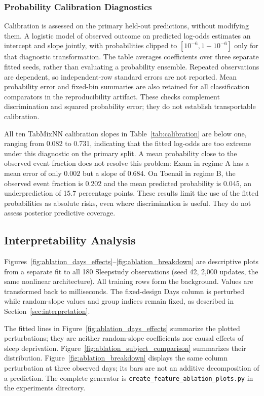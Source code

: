 \subsubsection{Probability Calibration Diagnostics}
Calibration is assessed on the primary held-out predictions, without modifying
them. A logistic model of observed outcome on predicted log-odds estimates an
intercept and slope jointly, with probabilities clipped to $[10^{-6},1-10^{-6}]$
only for that diagnostic transformation. The table averages coefficients over
three separate fitted seeds, rather than evaluating a probability ensemble.
Repeated observations are dependent, so independent-row standard errors are
not reported. Mean probability error and fixed-bin summaries are also retained
for all classification comparators in the reproducibility artifact. These
checks complement discrimination and squared probability error; they do not
establish transportable calibration.


\FloatBarrier

All ten TabMixNN calibration slopes in Table~\ref{tab:calibration} are below
one, ranging from 0.082 to 0.731, indicating that the fitted log-odds are too
extreme under this diagnostic on the primary split. A mean probability close
to the observed event fraction does not resolve this problem: Exam in regime
A has a mean error of only $0.002$ but a slope of 0.684. On Toenail in regime
B, the observed event fraction is 0.202 and the mean predicted probability
is 0.045, an underprediction of 15.7 percentage points. These results limit
the use of the fitted probabilities as absolute risks, even where
discrimination is useful. They do not assess posterior predictive coverage.

\subsection{Interpretability Analysis}

Figures~\ref{fig:ablation_days_effects}--\ref{fig:ablation_breakdown} are descriptive plots from a separate fit to all 180 Sleepstudy observations (seed 42, 2,000 updates, the same nonlinear architecture). All training rows form the background. Values are transformed back to milliseconds. The fixed-design Days column is perturbed while random-slope values and group indices remain fixed, as described in Section~\ref{sec:interpretation}.


\FloatBarrier

The fitted lines in Figure~\ref{fig:ablation_days_effects} summarize the plotted perturbations; they are neither random-slope coefficients nor causal effects of sleep deprivation. Figure~\ref{fig:ablation_subject_comparison} summarizes their distribution. Figure~\ref{fig:ablation_breakdown} displays the same column perturbation at three observed days; its bars are not an additive decomposition of a prediction. The complete generator is \texttt{create\_feature\_ablation\_plots.py} in the experiments directory.

